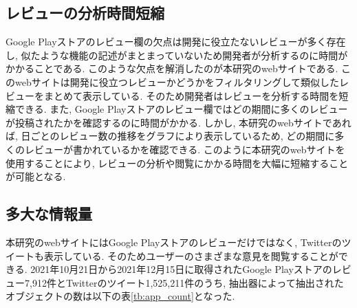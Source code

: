 



\subsection{レビューの分析時間短縮}
Google Playストアのレビュー欄の欠点は開発に役立たないレビューが多く存在し, 似たような機能の記述がまとまっていないため開発者が分析するのに時間がかかることである. 
このような欠点を解消したのが本研究のwebサイトである. このwebサイトは開発に役立つレビューかどうかをフィルタリングして類似したレビューをまとめて表示している. そのため開発者はレビューを分析する時間を短縮できる. 
また, Google Playストアのレビュー欄ではどの期間に多くのレビューが投稿されたかを確認するのに時間がかかる. しかし, 本研究のwebサイトであれば, 日ごとのレビュー数の推移をグラフにより表示しているため, どの期間に多くのレビューが書かれているかを確認できる. 
このように本研究のwebサイトを使用することにより, レビューの分析や閲覧にかかる時間を大幅に短縮することが可能となる. 

\subsection{多大な情報量}
本研究のwebサイトにはGoogle Playストアのレビューだけではなく, Twitterのツイートも表示している. そのためユーザーのさまざまな意見を閲覧することができる. 
2021年10月21日から2021年12月15日に取得されたGoogle Playストアのレビュー7,912件とTwitterのツイート1,525,211件のうち, 抽出器によって抽出されたオブジェクトの数は以下の表\ref{tb:app_count}となった. 

